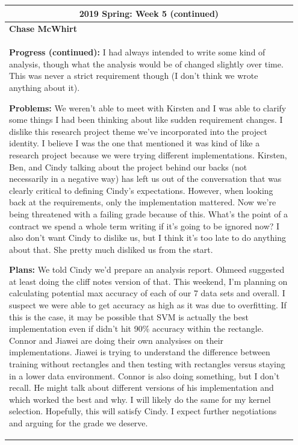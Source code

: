 \documentclass[10pt,journal,compsoc, draftclsnofoot,onecolumn]{IEEEtran}
\begin{document}
\begin{center}
\begin{tabular}{|p{0.95\linewidth}|}
\hline
\multicolumn{1}{|c|}{\textbf{2019 Spring: Week 5 (continued)}} \\
\hline
\textbf{Chase McWhirt} \\ [0.5ex]
\hline\hline

\textbf{Progress (continued):} I had always intended to write some kind of analysis, though what the analysis would be of changed slightly over time.
This was never a strict requirement though (I don't think we wrote anything about it).

\textbf{Problems:} We weren't able to meet with Kirsten and I was able to clarify some things I had been thinking about like sudden requirement changes.
I dislike this research project theme we've incorporated into the project identity.
I believe I was the one that mentioned it was kind of like a research project because we were trying different implementations.
Kirsten, Ben, and Cindy talking about the project behind our backs (not necessarily in a negative way) has left us out of the conversation that was clearly critical to defining Cindy's expectations.
However, when looking back at the requirements, only the implementation mattered.
Now we're being threatened with a failing grade because of this.
What's the point of a contract we spend a whole term writing if it's going to be ignored now?
I also don't want Cindy to dislike us, but I think it's too late to do anything about that.
She pretty much disliked us from the start.

\textbf{Plans:} We told Cindy we'd prepare an analysis report.
Ohmeed suggested at least doing the cliff notes version of that.
This weekend, I'm planning on calculating potential max accuracy of each of our 7 data sets and overall.
I suspect we were able to get accuracy as high as it was due to overfitting.
If this is the case, it may be possible that SVM is actually the best implementation even if didn't hit 90\% accuracy within the rectangle.
Connor and Jiawei are doing their own analysises on their implementations.
Jiawei is trying to understand the difference between training without rectangles and then testing with rectangles versus staying in a lower data environment.
Connor is also doing something, but I don't recall.
He might talk about different versions of his implementation and which worked the best and why.
I will likely do the same for my kernel selection.
Hopefully, this will satisfy Cindy.
I expect further negotiations and arguing for the grade we deserve.
\\ \hline
\end{tabular}
\end{center}
\end{document}
